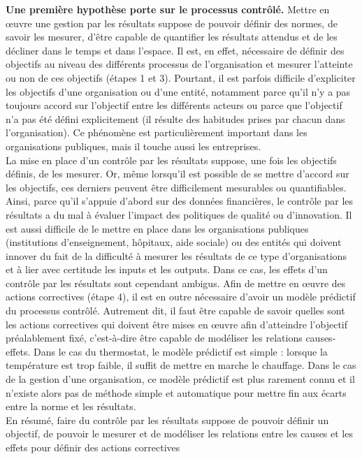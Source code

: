 \documentclass{tufte-handout}
\begin{document}
\begin{enumerate}
\textbf{Une première hypothèse porte sur le processus contrôlé.} Mettre en œuvre une gestion par les résultats suppose de pouvoir définir des normes, de savoir les mesurer, d’être capable de quantifier les résultats attendus et de les décliner dans le temps et dans l’espace. Il est, en effet, nécessaire de définir des objectifs au niveau des différents processus de l’organisation et mesurer l’atteinte ou non de ces objectifs (étapes 1 et 3). Pourtant, il est parfois difficile d’expliciter les objectifs d’une organisation ou d’une entité, notamment parce qu’il n’y a pas toujours accord sur l’objectif entre les différents acteurs ou parce que l’objectif n’a pas été défini explicitement (il résulte des habitudes prises par chacun dans l’organisation). Ce phénomène est particulièrement important dans les organisations publiques, mais il touche aussi les entreprises.\\
La mise en place d’un contrôle par les résultats suppose, une fois les objectifs définis, de les mesurer. Or, même lorsqu’il est possible de se mettre d’accord sur les objectifs, ces derniers peuvent être difficilement mesurables ou quantifiables. Ainsi, parce qu’il s’appuie d’abord sur des données financières, le contrôle par les résultats a du mal à évaluer l’impact des politiques de qualité ou d’innovation. Il est aussi difficile de le mettre en place dans les organisations publiques (institutions d’enseignement, hôpitaux, aide sociale) ou des entités qui doivent innover du fait de la difficulté à mesurer les résultats de ce type d’organisations et à lier avec certitude les inputs et les outputs. Dans ce cas, les effets d’un contrôle par les résultats sont cependant ambigus. Afin de mettre en œuvre des actions correctives (étape 4), il est en outre nécessaire d’avoir un modèle prédictif du processus contrôlé. Autrement dit, il faut être capable de savoir quelles sont les actions correctives qui doivent être mises en œuvre afin d’atteindre l’objectif préalablement fixé, c’est-à-dire être capable de modéliser les relations causes-effets. Dans le cas du thermostat, le modèle prédictif est simple : lorsque la température est trop faible, il suffit de mettre en marche le chauffage. Dans le cas de la gestion d’une organisation, ce modèle prédictif est plus rarement connu et il n’existe alors pas de méthode simple et automatique pour mettre fin aux écarts entre la norme et les résultats.\\
En résumé, faire du contrôle par les résultats suppose de pouvoir définir un objectif, de pouvoir le mesurer et de modéliser les relations entre les causes et les effets pour définir des actions correctives\\


\end{enumerate}
\end{document}
